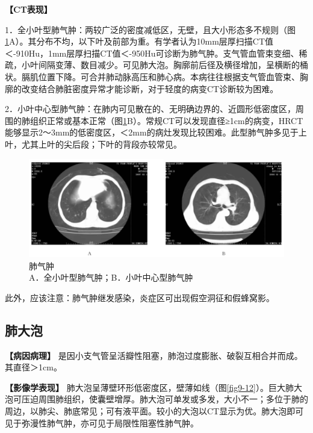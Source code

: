 \textbf{【CT表现】}

1．全小叶型肺气肿：两较广泛的密度减低区，无壁，且大小形态多不规则（图\ref{fig9-11}A）。其分布不均，以下叶及前部为重。有学者认为10mm层厚扫描CT值＜-910Hu，1mm层厚扫描CT值＜-950Hu可诊断为肺气肿。支气管血管束变细、稀疏，小叶间隔变薄、数目减少。可见肺大泡。胸廓前后径及横径增加，呈横断的桶状。膈肌位置下降。可合并肺动脉高压和肺心病。本病往往根据支气管血管束、胸廓的改变结合肺脏密度异常才能诊断，对于轻度的病变CT诊断较为困难。

2．小叶中心型肺气肿：在肺内可见散在的、无明确边界的、近圆形低密度区，周围的肺组织正常或基本正常（图\ref{fig9-11}B）。常规CT可以发现直径≥1cm的病变，HRCT能够显示2～3mm的低密度区，＜2mm的病灶发现比较困难。此型肺气肿多见于上叶，尤其上叶的尖后段；下叶的背段亦较常见。

\begin{figure}[!htbp]
 \centering
 \includegraphics[width=.7\textwidth,height=\textheight,keepaspectratio]{./images/Image00195.jpg}
 \captionsetup{justification=centering}
 \caption{肺气肿\\{\small A．全小叶型肺气肿；B．小叶中心型肺气肿}}
 \label{fig9-11}
  \end{figure} 

此外，应该注意：肺气肿继发感染，炎症区可出现假空洞征和假蜂窝影。

\subsection{肺大泡}

\textbf{【病因病理】}
是因小支气管呈活瓣性阻塞，肺泡过度膨胀、破裂互相合并而成。其直径＞1cm。

\textbf{【影像学表现】}
肺大泡呈薄壁环形低密度区，壁薄如线（图\ref{fig9-12}）。巨大肺大泡可压迫周围肺组织，使囊壁增厚。肺大泡可单发或多发，大小不一；多位于肺的周边，以肺尖、肺底常见；可有液平面。较小的大泡以CT显示为优。肺大泡即可见于弥漫性肺气肿，亦可见于局限性阻塞性肺气肿。

